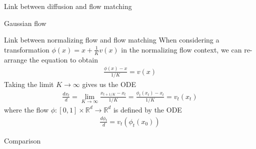 \documentclass{beamer}
\begin{document}
\begin{frame}{Link between diffusion and flow matching}
    \begin{block}{Gaussian flow}

        
    \end{block}
\end{frame}

\begin{frame}{Link between normalizing flow and flow matching}
    When considering a transformation \(\phi(x)=x+\frac{1}{K}v(x)\) in the normalizing flow context, we can re-arrange the equation to obtain
    \begin{align*}
        \frac{\phi(x)-x}{1/K}=v(x)
    \end{align*}
    Taking the limit \(K\rightarrow \infty\) gives us the ODE
    \begin{align*}
        \frac{dx_t}{d}=\lim_{K\rightarrow \infty}\frac{x_{t+1/K}-x_t}{1/K}=\frac{\phi_t(x_t)-x_t}{1/K}=v_t(x_t)
    \end{align*} 
    where the flow \( \phi:[0,1]\times\mathbb{R}^d\rightarrow\mathbb{R}^d\) is defined by the ODE
    \begin{align*}
        \frac{d\phi_t}{d}=v_t(\phi_t(x_0))
    \end{align*}
\end{frame}

\begin{frame}{Comparison}
\end{frame}
\end{document}
